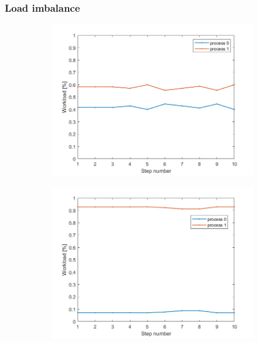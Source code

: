 \documentclass{beamer}
\begin{document}
\begin{frame} %
	\frametitle{Load imbalance}
	\begin{figure}
		\begin{subfigure}{.333\textwidth}
			\includegraphics[width=\linewidth]{etc/test4_1.jpeg}
		\end{subfigure}%
		\begin{subfigure}{.333\textwidth}
			\includegraphics[width=\linewidth]{etc/test5_1.jpeg}

\end{subfigure}
\end{figure}
\end{frame}
\end{document}
